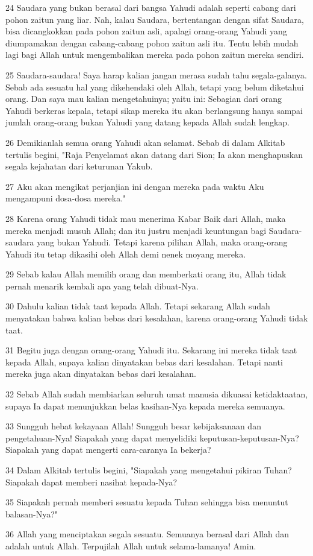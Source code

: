 \par 24 Saudara yang bukan berasal dari bangsa Yahudi adalah seperti cabang dari pohon zaitun yang liar. Nah, kalau Saudara, bertentangan dengan sifat Saudara, bisa dicangkokkan pada pohon zaitun asli, apalagi orang-orang Yahudi yang diumpamakan dengan cabang-cabang pohon zaitun asli itu. Tentu lebih mudah lagi bagi Allah untuk mengembalikan mereka pada pohon zaitun mereka sendiri.
\par 25 Saudara-saudara! Saya harap kalian jangan merasa sudah tahu segala-galanya. Sebab ada sesuatu hal yang dikehendaki oleh Allah, tetapi yang belum diketahui orang. Dan saya mau kalian mengetahuinya; yaitu ini: Sebagian dari orang Yahudi berkeras kepala, tetapi sikap mereka itu akan berlangsung hanya sampai jumlah orang-orang bukan Yahudi yang datang kepada Allah sudah lengkap.
\par 26 Demikianlah semua orang Yahudi akan selamat. Sebab di dalam Alkitab tertulis begini, "Raja Penyelamat akan datang dari Sion; Ia akan menghapuskan segala kejahatan dari keturunan Yakub.
\par 27 Aku akan mengikat perjanjian ini dengan mereka pada waktu Aku mengampuni dosa-dosa mereka."
\par 28 Karena orang Yahudi tidak mau menerima Kabar Baik dari Allah, maka mereka menjadi musuh Allah; dan itu justru menjadi keuntungan bagi Saudara-saudara yang bukan Yahudi. Tetapi karena pilihan Allah, maka orang-orang Yahudi itu tetap dikasihi oleh Allah demi nenek moyang mereka.
\par 29 Sebab kalau Allah memilih orang dan memberkati orang itu, Allah tidak pernah menarik kembali apa yang telah dibuat-Nya.
\par 30 Dahulu kalian tidak taat kepada Allah. Tetapi sekarang Allah sudah menyatakan bahwa kalian bebas dari kesalahan, karena orang-orang Yahudi tidak taat.
\par 31 Begitu juga dengan orang-orang Yahudi itu. Sekarang ini mereka tidak taat kepada Allah, supaya kalian dinyatakan bebas dari kesalahan. Tetapi nanti mereka juga akan dinyatakan bebas dari kesalahan.
\par 32 Sebab Allah sudah membiarkan seluruh umat manusia dikuasai ketidaktaatan, supaya Ia dapat menunjukkan belas kasihan-Nya kepada mereka semuanya.
\par 33 Sungguh hebat kekayaan Allah! Sungguh besar kebijaksanaan dan pengetahuan-Nya! Siapakah yang dapat menyelidiki keputusan-keputusan-Nya? Siapakah yang dapat mengerti cara-caranya Ia bekerja?
\par 34 Dalam Alkitab tertulis begini, "Siapakah yang mengetahui pikiran Tuhan? Siapakah dapat memberi nasihat kepada-Nya?
\par 35 Siapakah pernah memberi sesuatu kepada Tuhan sehingga bisa menuntut balasan-Nya?"
\par 36 Allah yang menciptakan segala sesuatu. Semuanya berasal dari Allah dan adalah untuk Allah. Terpujilah Allah untuk selama-lamanya! Amin.

